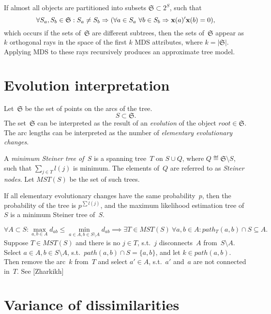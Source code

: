 \documentclass[10pt,a4paper]{article}
\theoremstyle{plain} \newtheorem{Lem}{Lemma}
\begin{document}
If almost all objects are partitioned into subsets $\mathfrak S \subset 2^S$, such that
$$ \forall S_a, S_b \in \mathfrak S : S_a \ne S_b
  \Rightarrow (\forall a \in S_a \ \forall b \in S_b \Rightarrow \mathbf x(a)' \mathbf x(b) = 0),
$$
which occurs if the sets of~$\mathfrak S$ are different subtrees,
then the sets of~$\mathfrak S$ appear as $k$ orthogonal rays in the space of the first $k$ MDS attributes,
where $k = |\mathfrak S|$.
Applying MDS to these rays recursively produces an approximate tree model.



\section{Evolution interpretation}
Let~$\mathfrak S$ be the set of points on the arcs of the tree.
$$ S \subset \mathfrak S. $$
The set~$\mathfrak S$ can be interpreted as the result of an {\em evolution} of the object $root \in \mathfrak S$.
The arc lengths can be interpreted as the number of {\em elementary evolutionary changes}.

A {\em minimum Steiner tree of~$S$} is a spanning tree~$T$ on $S \cup Q$, where $Q \eqdef \mathfrak S \setminus S$,
such that $\sum_{j \in T} l(j)$ is minimum.
The elements of~$Q$ are referred to as {\em Steiner nodes}.
Let $MST(S)$ be the set of such trees.

If all elementary evolutionary changes have the same probability~$p$,
then the probability of the tree is $p^{\sum l(j)}$,
and the maximum likelihood estimation tree of~$S$ is a minimum Steiner tree of~$S$.

{ $$ \forall A \subset S : \max_{a,b \in A} d_{ab} \le \min_{a \in A, b \in S \setminus A} d_{ab} \implies
    \exists T \in MST(S) \ \forall a,b \in A : path_T(a,b) \cap S \subseteq A.
  $$
}
\proof
{ Suppose $T \in MST(S)$ and there is no $j \in T$, s.t.~$j$ disconnects~$A$ from~$S \setminus A$.
  Select $a \in A, b \in S \setminus A$, s.t.~$path(a,b) \cap S = \{a,b\}$, and let $k \in path(a,b)$.
  Then remove the arc~$k$ from~$T$ and select $a' \in A$, s.t.~$a'$ and~$a$ are not connected in~$T$.
  See [Zharkikh]
}



\section{Variance of dissimilarities}
\end{document}
